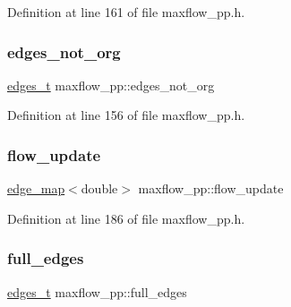 Definition at line 161 of file maxflow\+\_\+pp.\+h.

\mbox{\label{classmaxflow__pp_ad2cae6d52735a83abc830ce518843a31}} 
\subsubsection{\texorpdfstring{edges\+\_\+not\+\_\+org}{edges\_not\_org}}
{\footnotesize\ttfamily \mbox{\hyperlink{edge_8h_a8f9587479bda6cf612c103494b3858e3}{edges\+\_\+t}} maxflow\+\_\+pp\+::edges\+\_\+not\+\_\+org\hspace{0.3cm}{\ttfamily [protected]}}



Definition at line 156 of file maxflow\+\_\+pp.\+h.

\mbox{\label{classmaxflow__pp_ad37aff831935b2cfd4b03bc4a6da06ce}} 
\subsubsection{\texorpdfstring{flow\+\_\+update}{flow\_update}}
{\footnotesize\ttfamily \mbox{\hyperlink{classedge__map}{edge\+\_\+map}}$<$double$>$ maxflow\+\_\+pp\+::flow\+\_\+update\hspace{0.3cm}{\ttfamily [protected]}}



Definition at line 186 of file maxflow\+\_\+pp.\+h.

\mbox{\label{classmaxflow__pp_a504adabbe1e7b11a910d6c43a6b71a75}} 
\subsubsection{\texorpdfstring{full\+\_\+edges}{full\_edges}}
{\footnotesize\ttfamily \mbox{\hyperlink{edge_8h_a8f9587479bda6cf612c103494b3858e3}{edges\+\_\+t}} maxflow\+\_\+pp\+::full\+\_\+edges\hspace{0.3cm}{\ttfamily [protected]}}



